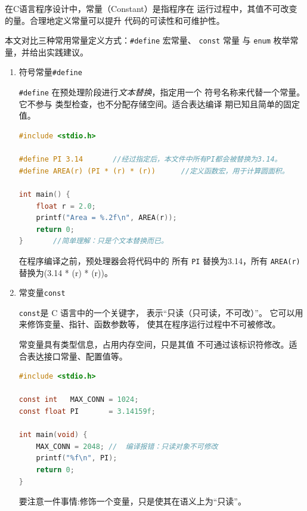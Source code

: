 在C语言程序设计中，常量（Constant）是指程序在
运行过程中，其值不可改变的量。合理地定义常量可以提升
代码的可读性和可维护性。



本文对比三种常用常量定义方式：\texttt{\#define} 宏常量、
\texttt{const} 常量
与 \texttt{enum} 枚举常量，并给出实践建议。

\newpage

\begin{enumerate}[label={(\arabic*)}]
\item 符号常量\texttt{\#define} 

\texttt{\#define} 在预处理阶段进行\emph{文本替换}，指定用一个
符号名称来代替一个常量。它不参与
类型检查，也不分配存储空间。适合表达编译
期已知且简单的固定值。

\begin{lstlisting}[language=C,caption={使用 \#define 定义宏常量},label={lst:define}]
#include <stdio.h>

#define PI 3.14       //经过指定后，本文件中所有PI都会被替换为3.14。
#define AREA(r) (PI * (r) * (r))      //定义函数宏，用于计算圆面积。

int main() {
    float r = 2.0;
    printf("Area = %.2f\n", AREA(r));
    return 0;
}       //简单理解：只是个文本替换而已。

\end{lstlisting}

在程序编译之前，预处理器会将代码中的
所有 \texttt{PI} 替换为3.14，所有 \texttt{AREA(r)}
 替换为(3.14 * (r) * (r))。

\item 常变量\texttt{const}  
   
\texttt{const}是 C 语言中的一个关键字，
表示“只读（只可读，不可改）”。
它可以用来修饰变量、指针、函数参数等，
使其在程序运行过程中不可被修改。

常变量具有类型信息，占用内存空间，只是其值
不可通过该标识符修改。适合表达接口常量、配置值等。

\begin{lstlisting}[language=C,caption={使用 const 定
  义常量变量},label={lst:const}]
#include <stdio.h>

const int   MAX_CONN = 1024;
const float PI       = 3.14159f;

int main(void) {
    MAX_CONN = 2048; //  编译报错：只读对象不可修改
    printf("%f\n", PI);
    return 0;
}
\end{lstlisting}

\newpage
要注意一件事情:修饰一个变量，只是使其在语义上为“只读”。



\end{enumerate}
